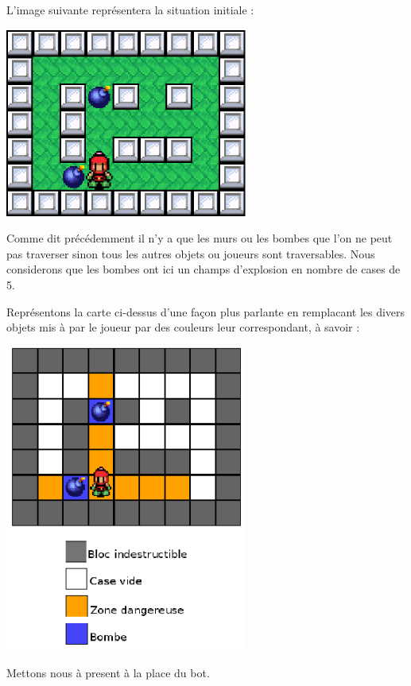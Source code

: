 			L'image suivante représentera la situation initiale :
			
			\begin{center}
				\includegraphics[width=8cm]{./Analyse/Img/largeur_0.eps}
			\end{center}
			
			Comme dit précédemment il n'y a que les murs ou les bombes que l'on ne peut
			pas traverser sinon tous les autres objets ou joueurs sont traversables.
			Nous considerons que les bombes ont ici un champs d'explosion en nombre de
			cases de 5.			
			
			Représentons la carte ci-dessus d'une façon plus parlante en remplacant les
			divers objets mis à par le joueur par des couleurs leur correspondant, à
			savoir :
			
			\begin{center}
				\includegraphics[width=8cm]{./Analyse/Img/largeur_1.eps}
			\end{center}
			
			Mettons nous à present à la place du \gls{bot}.
			
